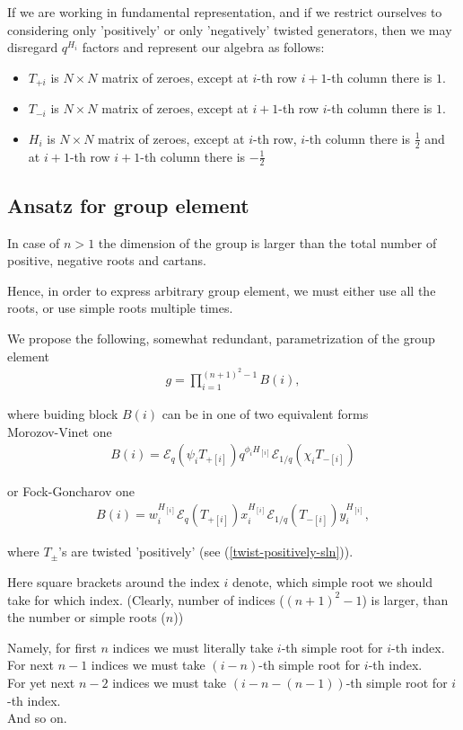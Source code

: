 \documentclass{article}
\newcommand{\lb}{\left (}
\newcommand{\rb}{\right )}
\newcommand{\B}[1]{\lb #1 \rb}
\newcommand{\lsb}{\left [}
\newcommand{\rsb}{\right ]}
\newcommand{\SB}[1]{\lsb #1 \rsb}
\newcommand{\be}{\begin{eqnarray}}
\newcommand{\ee}{\end{eqnarray}}
\newcommand {\?}{\textit{???}}
\newcommand{\me}[0]{\mathcal{E}}
\newcommand{\Tp}[1][]{T_{+ #1}}
\newcommand{\Tm}[1][]{T_{- #1}}
\newcommand{\delabel}[1]{(\ref{#1})}
\begin{document}
If we are working in fundamental representation, and if we restrict ourselves to considering
only 'positively' or only 'negatively' twisted generators, then we may disregard $q^{H_i}$
factors and represent our algebra as follows:
\begin{itemize}
\item $\Tp[i]$ is $N \times N$ matrix of zeroes, except at $i$-th row $i + 1$-th column there is $1$.
\item $\Tm[i]$ is $N \times N$ matrix of zeroes, except at $i+1$-th row $i$-th column there is $1$.
\item $H_i$ is $N \times N$ matrix of zeroes, except at $i$-th row, $i$-th column there is $\frac{1}{2}$
and at $i+1$-th row $i+1$-th column there is $-\frac{1}{2}$
\end{itemize}

\subsection{Ansatz for group element}

In case of $n > 1$ the dimension of the group is larger than the total number of positive, negative roots and cartans.

Hence, in order to express arbitrary group element, we must either use all the roots,
or use simple roots multiple times.

We propose the following, somewhat redundant, parametrization of the group element
\be
\label{quantum-group-element-sln}
g = \prod_{i = 1}^{(n+1)^2 - 1}B(i),
\ee

where buiding block $B(i)$ can be in one of two equivalent forms \\
Morozov-Vinet one
\be
\label{building-block-mv-sln}
B(i) = \me_q \B{\psi_i \Tp[\SB{i}]} q^{\phi_i H_{[i]}} \me_{1/q} \B{\chi_i \Tm[\SB{i}]}
\ee

or Fock-Goncharov one
\be
\label{building-block-fg-sln}
B(i) = w_i^{H_{[i]}} \me_q \B{\Tp[\SB{i}]} x_i^{H_{[i]}} \me_{1/q} \B{\Tm[\SB{i}]} y_i^{H_{[i]}},
\ee

where $T_\pm$'s are twisted 'positively' (see \delabel{twist-positively-sln}).

Here square brackets around the index $i$ denote, which simple root
we should take for which index. (Clearly, number of indices ($(n + 1)^2 - 1$) is larger, than the number
or simple roots ($n$))

Namely, for first $n$ indices we must literally take $i$-th simple root for $i$-th index. \\
For next $n - 1$ indices we must take $(i - n)$-th simple root for $i$-th index. \\
For yet next $n - 2$ indices we must take $(i - n - (n - 1))$-th simple root for $i$-th index. \\
And so on.
\end{document}
